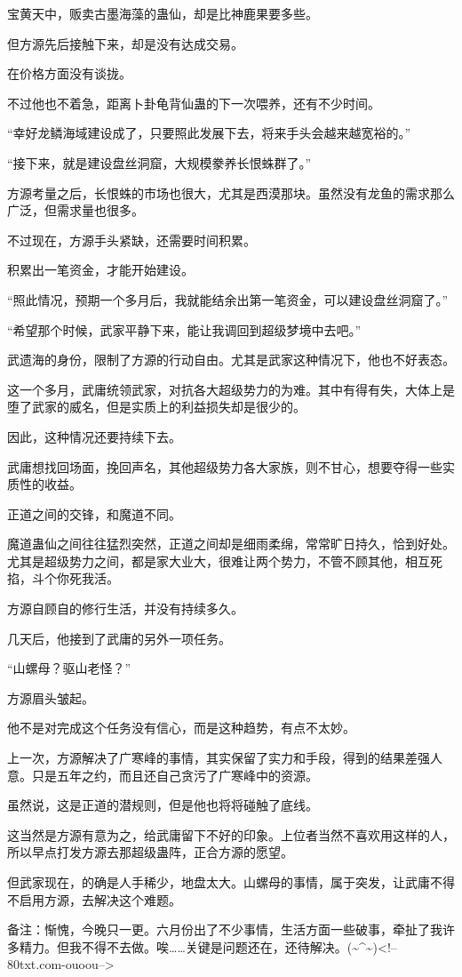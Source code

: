 \begin{this_body}
宝黄天中，贩卖古墨海藻的蛊仙，却是比神鹿果要多些。

但方源先后接触下来，却是没有达成交易。

在价格方面没有谈拢。

不过他也不着急，距离卜卦龟背仙蛊的下一次喂养，还有不少时间。

“幸好龙鳞海域建设成了，只要照此发展下去，将来手头会越来越宽裕的。”

“接下来，就是建设盘丝洞窟，大规模豢养长恨蛛群了。”

方源考量之后，长恨蛛的市场也很大，尤其是西漠那块。虽然没有龙鱼的需求那么广泛，但需求量也很多。

不过现在，方源手头紧缺，还需要时间积累。

积累出一笔资金，才能开始建设。

“照此情况，预期一个多月后，我就能结余出第一笔资金，可以建设盘丝洞窟了。”

“希望那个时候，武家平静下来，能让我调回到超级梦境中去吧。”

武遗海的身份，限制了方源的行动自由。尤其是武家这种情况下，他也不好表态。

这一个多月，武庸统领武家，对抗各大超级势力的为难。其中有得有失，大体上是堕了武家的威名，但是实质上的利益损失却是很少的。

因此，这种情况还要持续下去。

武庸想找回场面，挽回声名，其他超级势力各大家族，则不甘心，想要夺得一些实质性的收益。

正道之间的交锋，和魔道不同。

魔道蛊仙之间往往猛烈突然，正道之间却是细雨柔绵，常常旷日持久，恰到好处。尤其是超级势力之间，都是家大业大，很难让两个势力，不管不顾其他，相互死掐，斗个你死我活。

方源自顾自的修行生活，并没有持续多久。

几天后，他接到了武庸的另外一项任务。

“山螺母？驱山老怪？”

方源眉头皱起。

他不是对完成这个任务没有信心，而是这种趋势，有点不太妙。

上一次，方源解决了广寒峰的事情，其实保留了实力和手段，得到的结果差强人意。只是五年之约，而且还自己贪污了广寒峰中的资源。

虽然说，这是正道的潜规则，但是他也将将碰触了底线。

这当然是方源有意为之，给武庸留下不好的印象。上位者当然不喜欢用这样的人，所以早点打发方源去那超级蛊阵，正合方源的愿望。

但武家现在，的确是人手稀少，地盘太大。山螺母的事情，属于突发，让武庸不得不启用方源，去解决这个难题。

备注：惭愧，今晚只一更。六月份出了不少事情，生活方面一些破事，牵扯了我许多精力。但我不得不去做。唉……关键是问题还在，还待解决。(\~{}\^{}\~{})<!--80txt.com-ouoou-->

\end{this_body}

